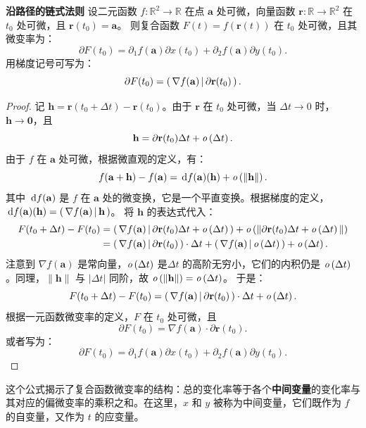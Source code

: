 \documentclass[12pt,UTF8]{ctexbook}
\begin{document}
\begin{tm}{\textbf{沿路径的链式法则}}
设二元函数 $f: \mathbb{R}^2 \to \mathbb{R}$ 在点 $\mathbf{a}$ 处可微，向量函数 $\mathbf{r}: \mathbb{R} \to \mathbb{R}^2$ 在 $t_0$ 处可微，且 $\mathbf{r}(t_0) = \mathbf{a}$。
则复合函数 $F(t) = f(\mathbf{r}(t))$ 在 $t_0$ 处可微，且其微变率为：
$$ \partial F(t_0) = \partial_1 f(\mathbf{a}) \partial x(t_0) + \partial_2 f(\mathbf{a}) \partial y(t_0). $$
用梯度记号可写为：
$$ \partial F(t_0) = \displaystyle\left( \,\nabla f(\mathbf{a}) \,\middle\vert \,\partial \mathbf{r}(t_0) \,\right). $$
\end{tm}
\begin{proof}
记 $\mathbf{h} = \mathbf{r}(t_0 + \Delta t) - \mathbf{r}(t_0)$。由于 $\mathbf{r}$ 在 $t_0$ 处可微，当 $\Delta t \to 0$ 时，$\mathbf{h} \to \mathbf{0}$，且
$$ \mathbf{h} = \partial \mathbf{r}(t_0) \Delta t + \mathit{o}\left(\Delta t\right). $$
由于 $f$ 在 $\mathbf{a}$ 处可微，根据微直观的定义，有：
$$ f(\mathbf{a} + \mathbf{h}) - f(\mathbf{a}) = \,\mathrm{d} f(\mathbf{a})(\mathbf{h}) + \mathit{o}\left(\|\mathbf{h}\|\right). $$
其中 $\,\mathrm{d} f(\mathbf{a})$ 是 $f$ 在 $\mathbf{a}$ 处的微变换，它是一个平直变换。根据梯度的定义，$\,\mathrm{d} f(\mathbf{a})(\mathbf{h}) = \displaystyle\left( \,\nabla f(\mathbf{a}) \,\middle\vert \,\mathbf{h} \,\right)$。
将 $\mathbf{h}$ 的表达式代入：
\begin{align*}
F(t_0 + \Delta t) - F(t_0) &= \displaystyle\left( \,\nabla f(\mathbf{a}) \,\middle\vert \,\partial \mathbf{r}(t_0) \Delta t + \mathit{o}\left(\Delta t\right) \,\right) + \mathit{o}\left(\|\partial \mathbf{r}(t_0) \Delta t + \mathit{o}\left(\Delta t\right)\|\right) \\
&= \displaystyle\left( \,\nabla f(\mathbf{a}) \,\middle\vert \,\partial \mathbf{r}(t_0) \,\right)\cdot \Delta t +  \displaystyle\left( \,\nabla f(\mathbf{a}) \,\middle\vert \, \mathit{o}\left(\Delta t\right) \,\right) + \mathit{o}\left(\Delta t\right).
\end{align*}
注意到 $\nabla f(\mathbf{a})$ 是常向量，$\mathit{o}\left(\Delta t\right)$ 是$\Delta t$ 的高阶无穷小，它们的内积仍是 $\mathit{o}\left(\Delta t\right)$。同理，$\|\mathbf{h}\|$ 与 $|\Delta t|$ 同阶，故 $\mathit{o}\left(\|\mathbf{h}\|\right) = \mathit{o}\left(\Delta t\right)$。
于是：
$$ F(t_0 + \Delta t) - F(t_0) = \displaystyle\left( \,\nabla f(\mathbf{a}) \,\middle\vert \,\partial \mathbf{r}(t_0) \,\right)\cdot \Delta t + \mathit{o}\left(\Delta t\right). $$
根据一元函数微变率的定义，$F$ 在 $t_0$ 处可微，且
$$ \partial F(t_0) = \nabla f(\mathbf{a}) \cdot \partial \mathbf{r}(t_0). $$
或者写为：
$$ \partial F(t_0) = \partial_1 f(\mathbf{a}) \partial x(t_0) + \partial_2 f(\mathbf{a}) \partial y(t_0). $$
\end{proof}

这个公式揭示了复合函数微变率的结构：总的变化率等于各个\textbf{中间变量}的变化率与其对应的偏微变率的乘积之和。在这里，$x$ 和 $y$ 被称为中间变量，它们既作为 $f$ 的自变量，又作为 $t$ 的应变量。

\end{document}
